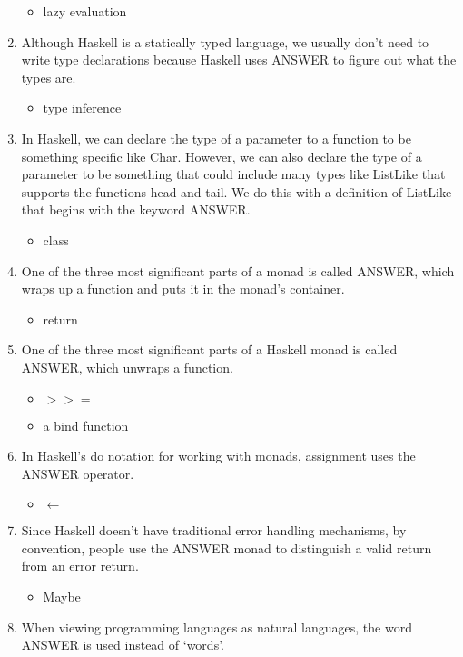 \documentclass{exam}
\begin{document}
\begin{enumerate}
\begin{itemize}
\item lazy evaluation
\end{itemize}
\item Although Haskell is a statically typed language, we usually don't need to write type declarations because Haskell uses ANSWER to figure out what the types are.
\begin{itemize}
\item type inference
\end{itemize}
\item In Haskell, we can declare the type of a parameter to a function to be something specific like Char.  However, we can also declare the type of a parameter to be something that could include many types like ListLike that supports the functions head and tail.  We do this with a definition of ListLike that begins with the keyword ANSWER.
\begin{itemize}
\item class
\end{itemize}
\item One of the three most significant parts of a monad is called ANSWER, which wraps up a function and puts it in the monad's container.
\begin{itemize}
\item return
\end{itemize}
\item One of the three most significant parts of a Haskell monad is called ANSWER, which unwraps a function.
\begin{itemize}
\item $>>=$
\item a bind function
\end{itemize}
\item In Haskell's do notation for working with monads, assignment uses the ANSWER operator.
\begin{itemize}
\item $\leftarrow$
\end{itemize}
\item Since Haskell doesn't have traditional error handling mechanisms, by convention, people use the ANSWER monad to distinguish a valid return from an error return.
\begin{itemize}
\item Maybe
\end{itemize}
\item When viewing programming languages as natural languages, the word ANSWER is used instead of `words'.

\end{enumerate}
\end{document}
